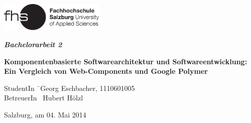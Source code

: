 \begin{titlepage}
\begin{center}

\includegraphics[width=5cm]{images/FHSLogo.pdf}

\vspace*{4cm}

\Large{
  \textit{\textbf{Bachelorarbeit 2}}
}

\vspace*{4cm}

\large{
  \textbf{Komponentenbasierte Softwarearchitektur und Softwareentwicklung: Ein Vergleich von Web-Components und Google Polymer}\\
}

\end{center}

\vfill

\begin{tabbing}
StudentIn \= \ Georg Eschbacher, 1110601005 \\
BetreuerIn \> \ Hubert Hölzl

\end{tabbing}

Salzburg, am 04. Mai 2014
\end{titlepage}
